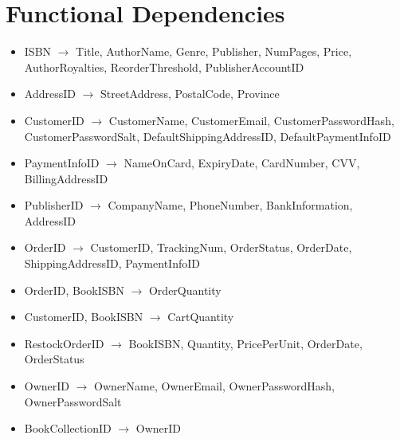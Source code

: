 \documentclass{article}
\newcommand{\trightarrow}{\(\rightarrow\)}
\begin{document}
\section{Functional Dependencies}
\begin{itemize}
  \item ISBN \trightarrow{} Title, AuthorName, Genre, Publisher, NumPages, Price, AuthorRoyalties, ReorderThreshold, PublisherAccountID
  \item AddressID \trightarrow{} StreetAddress, PostalCode, Province
  \item CustomerID \trightarrow{} CustomerName, CustomerEmail, CustomerPasswordHash, CustomerPasswordSalt, DefaultShippingAddressID, DefaultPaymentInfoID
  \item PaymentInfoID \trightarrow{} NameOnCard, ExpiryDate, CardNumber, CVV, BillingAddressID
  \item PublisherID \trightarrow{} CompanyName, PhoneNumber, BankInformation, AddressID
  \item OrderID \trightarrow{} CustomerID, TrackingNum, OrderStatus, OrderDate, ShippingAddressID, PaymentInfoID
  \item OrderID, BookISBN \trightarrow{} OrderQuantity
  \item CustomerID, BookISBN \trightarrow{} CartQuantity
  \item RestockOrderID \trightarrow{} BookISBN, Quantity, PricePerUnit, OrderDate, OrderStatus
  \item OwnerID \trightarrow{} OwnerName, OwnerEmail, OwnerPasswordHash, OwnerPasswordSalt
  \item BookCollectionID \trightarrow{} OwnerID
\end{itemize}
\end{document}
